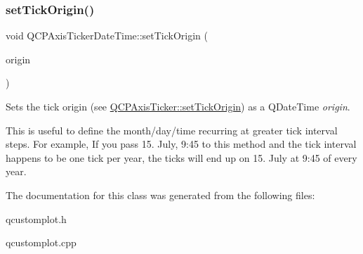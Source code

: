 \subsubsection{\texorpdfstring{set\+Tick\+Origin()}{setTickOrigin()}\hspace{0.1cm}{\footnotesize\ttfamily [2/2]}}
{\footnotesize\ttfamily void Q\+C\+P\+Axis\+Ticker\+Date\+Time\+::set\+Tick\+Origin (\begin{DoxyParamCaption}\item[{const Q\+Date\+Time \&}]{origin }\end{DoxyParamCaption})}

Sets the tick origin (see \hyperlink{classQCPAxisTicker_ab509c7e500293bf66a8409f0d7c23943}{Q\+C\+P\+Axis\+Ticker\+::set\+Tick\+Origin}) as a Q\+Date\+Time {\itshape origin}.

This is useful to define the month/day/time recurring at greater tick interval steps. For example, If you pass 15. July, 9\+:45 to this method and the tick interval happens to be one tick per year, the ticks will end up on 15. July at 9\+:45 of every year. 

The documentation for this class was generated from the following files\+:\begin{DoxyCompactItemize}
\item 
qcustomplot.\+h\item 
qcustomplot.\+cpp\end{DoxyCompactItemize}
